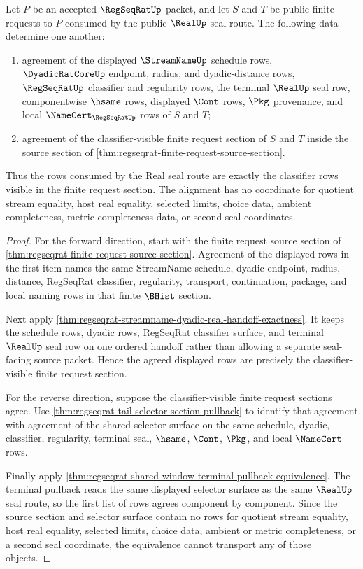 \begin{theorem}
\label{thm:regseqrat-finite-request-classifier-alignment}
Let $P$ be an accepted $\RegSeqRatUp$ packet, and let $S$ and $T$ be public
finite requests to $P$ consumed by the public $\RealUp$ seal route. The
following data determine one another:
\begin{enumerate}
\item agreement of the displayed $\StreamNameUp$ schedule rows,
$\DyadicRatCoreUp$ endpoint, radius, and dyadic-distance rows,
$\RegSeqRatUp$ classifier and regularity rows, the terminal $\RealUp$ seal
row, componentwise $\hsame$ rows, displayed $\Cont$ rows, $\Pkg$ provenance,
and local $\NameCert_{\RegSeqRatUp}$ rows of $S$ and $T$;
\item agreement of the classifier-visible finite request section of $S$ and
$T$ inside the source section of
\autoref{thm:regseqrat-finite-request-source-section}.
\end{enumerate}
Thus the rows consumed by the Real seal route are exactly the classifier rows
visible in the finite request section. The alignment has no coordinate for
quotient stream equality, host real equality, selected limits, choice data,
ambient completeness, metric-completeness data, or second seal coordinates.
\end{theorem}
\begin{proof}
For the forward direction, start with the finite request source section of
\autoref{thm:regseqrat-finite-request-source-section}. Agreement of the
displayed rows in the first item names the same StreamName schedule, dyadic
endpoint, radius, distance, RegSeqRat classifier, regularity, transport,
continuation, package, and local naming rows in that finite $\BHist$ section.

Next apply
\autoref{thm:regseqrat-streamname-dyadic-real-handoff-exactness}. It keeps the
schedule rows, dyadic rows, RegSeqRat classifier surface, and terminal
$\RealUp$ seal row on one ordered handoff rather than allowing a separate
seal-facing source packet. Hence the agreed displayed rows are precisely the
classifier-visible finite request section.

For the reverse direction, suppose the classifier-visible finite request
sections agree. Use
\autoref{thm:regseqrat-tail-selector-section-pullback} to identify that
agreement with agreement of the shared selector surface on the same schedule,
dyadic, classifier, regularity, terminal seal, $\hsame$, $\Cont$, $\Pkg$, and
local $\NameCert$ rows.

Finally apply
\autoref{thm:regseqrat-shared-window-terminal-pullback-equivalence}. The
terminal pullback reads the same displayed selector surface as the same
$\RealUp$ seal route, so the first list of rows agrees component by component.
Since the source section and selector surface contain no rows for quotient
stream equality, host real equality, selected limits, choice data, ambient or
metric completeness, or a second seal coordinate, the equivalence cannot
transport any of those objects.
\end{proof}

